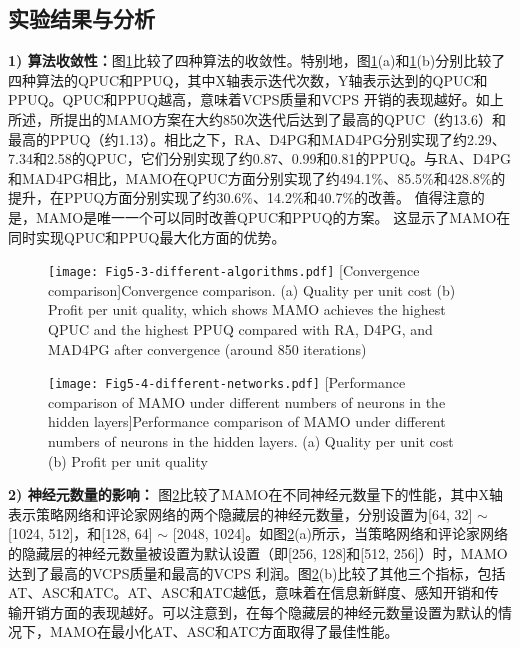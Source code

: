 \subsection{实验结果与分析}

\textbf{1) 算法收敛性：}图\ref{fig 4-3}比较了四种算法的收敛性。特别地，图\ref{fig 4-3}(a)和\ref{fig 4-3}(b)分别比较了四种算法的QPUC和PPUQ，其中X轴表示迭代次数，Y轴表示达到的QPUC和PPUQ。QPUC和PPUQ越高，意味着VCPS质量和VCPS 开销的表现越好。如上所述，所提出的MAMO方案在大约850次迭代后达到了最高的QPUC（约13.6）和最高的PPUQ（约1.13）。相比之下，RA、D4PG和MAD4PG分别实现了约2.29、7.34和2.58的QPUC，它们分别实现了约0.87、0.99和0.81的PPUQ。与RA、D4PG和MAD4PG相比，MAMO在QPUC方面分别实现了约494.1\%、85.5\%和428.8\%的提升，在PPUQ方面分别实现了约30.6\%、14.2\%和40.7\%的改善。
值得注意的是，MAMO是唯一一个可以同时改善QPUC和PPUQ的方案。
这显示了MAMO在同时实现QPUC和PPUQ最大化方面的优势。

\begin{figure}[h]
 \centering
 \texttt{[image: Fig5-3-different-algorithms.pdf]}
 [Convergence comparison]{Convergence comparison. (a) Quality per unit cost (b) Profit per unit quality, which shows MAMO achieves the highest QPUC and the highest PPUQ compared with RA, D4PG, and MAD4PG after convergence (around 850 iterations)}
 \label{fig 4-3}
\end{figure}

\begin{figure}[h]
 \centering
 \texttt{[image: Fig5-4-different-networks.pdf]}
 [Performance comparison of MAMO under different numbers of neurons in the hidden layers]{Performance comparison of MAMO under different numbers of neurons in the hidden layers. (a) Quality per unit cost (b) Profit per unit quality}
 \label{fig 4-4}
\end{figure}

\textbf{2) 神经元数量的影响：}
图\ref{fig 4-4}比较了MAMO在不同神经元数量下的性能，其中X轴表示策略网络和评论家网络的两个隐藏层的神经元数量，分别设置为[64, 32] $\sim$ [1024, 512]，和[128, 64] $\sim$ [2048, 1024]。如图\ref{fig 4-4}(a)所示，当策略网络和评论家网络的隐藏层的神经元数量被设置为默认设置（即[256, 128]和[512, 256]）时，MAMO达到了最高的VCPS质量和最高的VCPS 利润。图\ref{fig 4-4}(b)比较了其他三个指标，包括AT、ASC和ATC。AT、ASC和ATC越低，意味着在信息新鲜度、感知开销和传输开销方面的表现越好。可以注意到，在每个隐藏层的神经元数量设置为默认的情况下，MAMO在最小化AT、ASC和ATC方面取得了最佳性能。

